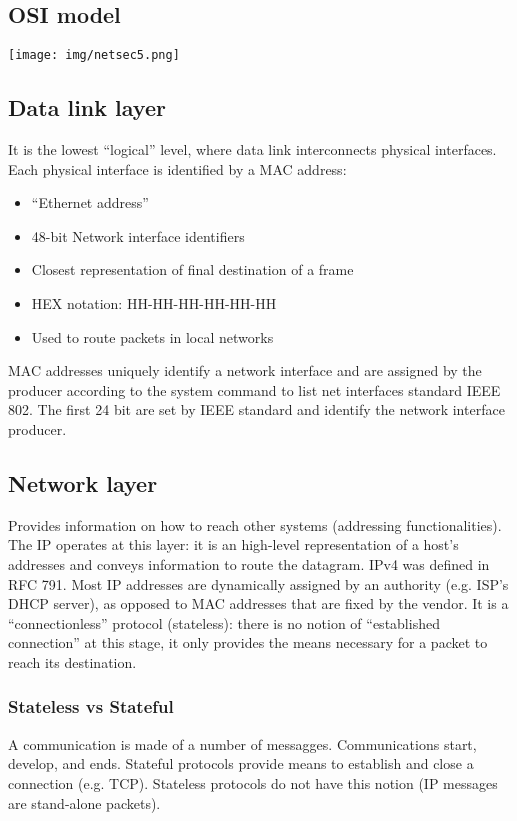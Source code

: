\documentclass[a4paper, 10pt, titlepage]{article}
\begin{document}
\subsection*{OSI model}
\begin{center}
	\texttt{[image: img/netsec5.png]}
\end{center}

\subsection{Data link layer}
It is the lowest “logical” level, where data link interconnects physical interfaces. Each physical interface is identified by a MAC address:
\begin{itemize}
\item “Ethernet address”
\item 48-bit Network interface identifiers
\item Closest representation of final destination of a frame
\item HEX notation: HH-HH-HH-HH-HH-HH
\item Used to route packets in local networks
\end{itemize}
MAC addresses uniquely identify a network interface and are assigned by the producer according to the system command to list net interfaces standard IEEE 802. The first 24 bit are set by IEEE standard and identify the network interface producer.

\subsection{Network layer}
Provides information on how to reach other systems (addressing functionalities). The IP operates at this layer: it is an high-level representation of a host’s addresses and conveys information to route the datagram. IPv4 was defined in RFC 791. Most IP addresses are dynamically assigned by an authority (e.g. ISP’s DHCP server), as opposed to MAC addresses that are fixed by the vendor. It is a “connectionless” protocol (stateless): there is no notion of “established connection” at this stage, it only provides the means necessary for a packet to reach its destination.

\subsubsection*{Stateless vs Stateful}
A communication is made of a number of messagges. Communications start, develop, and ends. Stateful protocols provide means to establish and close a connection (e.g. TCP). Stateless protocols do not have this notion (IP messages are stand-alone packets).
\end{document}
